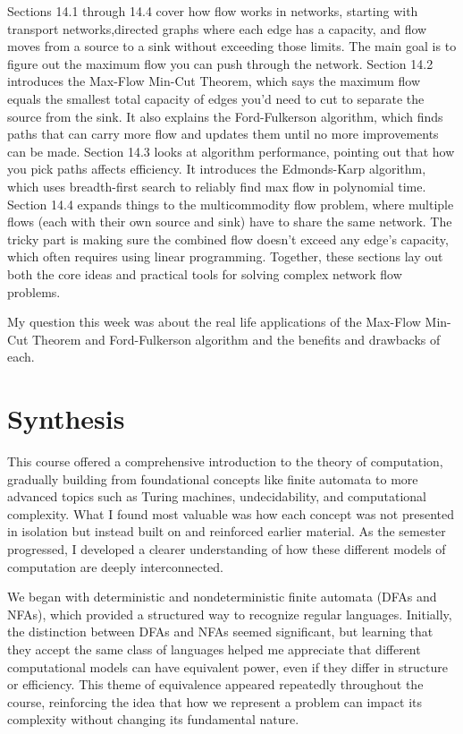 \documentclass{article}
\theoremstyle{theorem}
\theoremstyle{definition}
\theoremstyle{remark}
\begin{document}
Sections 14.1 through 14.4 cover how flow works in networks, starting with transport networks,directed graphs where each edge has a capacity, and 
flow moves from a source to a sink without exceeding those limits. The main goal is to figure out the maximum flow you can push through the network. 
Section 14.2 introduces the Max-Flow Min-Cut Theorem, which says the maximum flow equals the smallest total capacity of edges you’d need to cut to 
separate the source from the sink. It also explains the Ford-Fulkerson algorithm, which finds paths that can carry more flow and updates them until 
no more improvements can be made. Section 14.3 looks at algorithm performance, pointing out that how you pick paths affects efficiency. It introduces 
the Edmonds-Karp algorithm, which uses breadth-first search to reliably find max flow in polynomial time. Section 14.4 expands things to the multicommodity 
flow problem, where multiple flows (each with their own source and sink) have to share the same network. The tricky part is making sure the combined flow 
doesn’t exceed any edge’s capacity, which often requires using linear programming. Together, these sections lay out both the core ideas and practical tools 
for solving complex network flow problems.

My question this week was about the real life applications of the Max-Flow Min-Cut Theorem and Ford-Fulkerson algorithm and the benefits and drawbacks of each.


\section{Synthesis}

This course offered a comprehensive introduction to the theory of computation, gradually building from foundational concepts like finite automata to more advanced topics such as Turing machines, undecidability, and computational complexity. What I found most valuable was how each concept was not presented in isolation but instead built on and reinforced earlier material. As the semester progressed, I developed a clearer understanding of how these different models of computation are deeply interconnected.

We began with deterministic and nondeterministic finite automata (DFAs and NFAs), which provided a structured way to recognize regular languages. Initially, the distinction between DFAs and NFAs seemed significant, but learning that they accept the same class of languages helped me appreciate that different computational models can have equivalent power, even if they differ in structure or efficiency. This theme of equivalence appeared repeatedly throughout the course, reinforcing the idea that how we represent a problem can impact its complexity without changing its fundamental nature.
\end{document}
